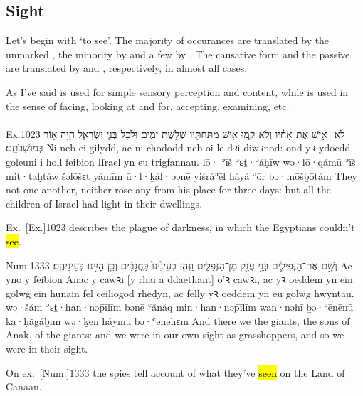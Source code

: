 \subsection{Sight}


\begin{paper}
	{\click} Let’s begin with  ‘to see’. The majority of occurances are translated by the unmarked , the minority by  and a few by . The causative form  and the passive  are translated by  and , respectively, in almost all cases.

	As I’ve said  is used for simple sensory perception and content, while  is used in the sense of facing, looking at and for, accepting, examining, etc.
\end{paper}


\paragraph{}


\begin{example}{Ex.}{10}{23}{}{}
	\quoling
	{לֹֽא־ אִ֣ישׁ אֶת־אָחִ֗יו וְלֹא־קָ֛מוּ אִ֥ישׁ מִתַּחְתָּ֖יו שְׁלֹ֣שֶׁת יָמִ֑ים וּֽלְכָל־בְּנֵ֧י יִשְׂרָאֵ֛ל הָ֥יָה א֖וֹר בְּמוֹשְׁבֹתָֽם׃}
	{Ni  neb ei gilydd, ac ni chododd neb oi le dꝛi diwꝛnod: ond yꝛ ydoedd goleuni i holl feibion Iſrael yn eu trigfannau.}
	{lō· ʾīš ʾɛṯ·ʾåḥīw wə·lō·qåmū ʾīš mit·taḥtåw šəlōšɛṯ yåmīm ū·l·ḵål·bənē yiśråʾēl håyå ʾōr bə·mōšḇōṯåm}
	{They  not one another, neither rose any from his place for three days: but all the children of Israel had light in their dwellings.}
\end{example}
\begin{paper}
	\explain Ex.~\vref{Ex.}{10}{23}{} describes the plague of darkness, in which the Egyptians couldn’t \hl{see}.
\end{paper}

\begin{example}{Num.}{13}{33}{}{}
	\quoling
	{וְשָׁ֣ם  אֶת־הַנְּפִילִ֛ים בְּנֵ֥י עֲנָ֖ק מִן־הַנְּפִלִ֑ים וַנְּהִ֤י בְעֵינֵ֙ינוּ֙ כַּֽחֲגָבִ֔ים וְכֵ֥ן הָיִ֖ינוּ בְּעֵינֵיהֶֽם׃}
	{Ac yno y  feibion Anac y cawꝛi [y rhai a ddaethant] o’ꝛ cawꝛi, ac yꝛ oeddem yn ein golwg ein hunain fel ceiliogod rhedyn, ac felly yꝛ oeddem yn eu golwg hwyntau.}
	{wə·šåm  ʾɛṯ·han·nəp̄īlīm bənē ʿănåq min·han·nəp̄īlīm wan·nəhī ḇə·ʿēnēnū ka·ḥăḡåḇīm wə·ḵēn håyīnū bə·ʿēnēhɛm}
	{And there we  the giants, the sons of Anak,  of the giants: and we were in our own sight as grasshoppers, and so we were in their sight.}
\end{example}
\begin{paper}
	\explain On ex.~\vref{Num.}{13}{33}{} the spies tell account of what they’ve \hl{seen} on the Land of Canaan.
\end{paper}



